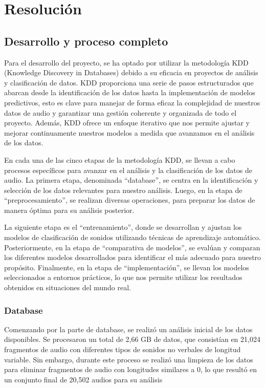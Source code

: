 
\section{Resolución}

\subsection{Desarrollo y proceso completo}

Para el desarrollo del proyecto, se ha optado por utilizar la metodología KDD (Knowledge Discovery in Databases) debido a su eficacia en proyectos de análisis y clasificación de datos. KDD proporciona una serie de pasos estructurados que abarcan desde la identificación de los datos hasta la implementación de modelos predictivos, esto es clave para manejar de forma eficaz la complejidad de nuestros datos de audio y garantizar una gestión coherente y organizada de todo el proyecto. Además, KDD ofrece un enfoque iterativo que nos permite ajustar y mejorar continuamente nuestros modelos a medida que avanzamos en el análisis de los datos.  

En cada una de las cinco etapas de la metodología KDD, se llevan a cabo procesos específicos para avanzar en el análisis y la clasificación de los datos de audio. La primera etapa, denominada ``database'', se centra en la identificación y selección de los datos relevantes para nuestro análisis. Luego, en la etapa de ``preprocesamiento'', se realizan diversas operaciones, para preparar los datos de manera óptima para su análisis posterior. 

La siguiente etapa es el ``entrenamiento'', donde se desarrollan y ajustan los modelos de clasificación de sonidos utilizando técnicas de aprendizaje automático. Posteriormente, en la etapa de ``comparativa de modelos'', se evalúan y comparan los diferentes modelos desarrollados para identificar el más adecuado para nuestro propósito. Finalmente, en la etapa de ``implementación'', se llevan los modelos seleccionados a entornos prácticos, lo que nos permite utilizar los resultados obtenidos en situaciones del mundo real.

\subsubsection{Database}

Comenzando por la parte de database, se realizó un análisis inicial de los datos disponibles. Se procesaron un total de 2,66 GB de datos, que consistían en 21,024 fragmentos de audio con diferentes tipos de sonidos no verbales de longitud variable. Sin embargo, durante este proceso se realizó una limpieza de los datos para eliminar fragmentos de audio con longitudes similares a 0, lo que resultó en un conjunto final de 20,502 audios para su análisis 

